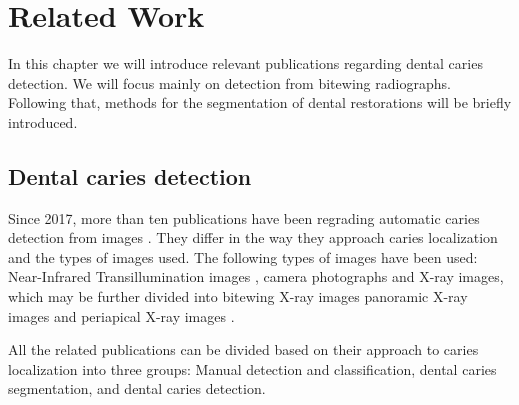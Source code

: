 \chapter{Related Work}
In this chapter we will introduce relevant publications regarding dental caries detection. We will focus mainly on detection from bitewing radiographs. Following that, methods for the segmentation of dental restorations will be briefly introduced.

\section{Dental caries detection}
Since 2017, more than ten publications have been regrading automatic caries detection from images \cite{PradosPrivado2020}. They differ in the way they approach caries localization and the types of images used. The following types of images have been used: Near-Infrared Transillumination images \cite{Casalegno2019,Schwendicke2020}, camera photographs \cite{Moutselos2019} and X-ray images, which may be further divided into bitewing X-ray images \cite{Moran2021, Cantu2020, Bayrakdar2021, Mao2021, Srivastava2017} panoramic X-ray images \cite{Lian2021} and periapical X-ray images \cite{Lee2018}.

All the related publications can be divided based on their approach to caries localization into three groups: Manual detection and classification, dental caries segmentation, and dental caries detection.

